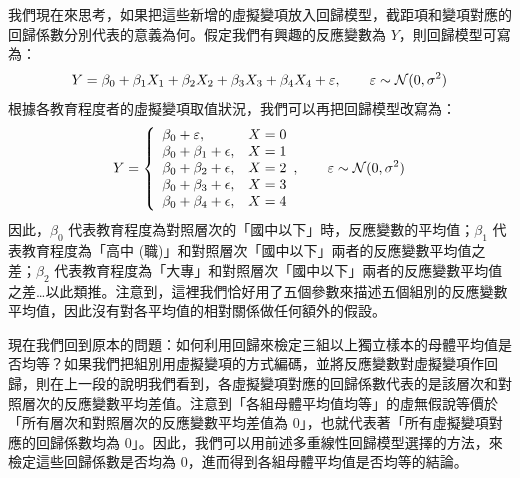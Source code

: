     我們現在來思考，如果把這些新增的虛擬變項放入回歸模型，截距項和變項對應的回歸係數分別代表的意義為何。假定我們有興趣的反應變數為 $Y$，則回歸模型可寫為：
    \[Y = \beta_0 + \beta_1 X_1 + \beta_2 X_2 + \beta_3 X_3 + \beta_4 X_4 + \varepsilon, \qquad \varepsilon \sim \mathcal{N}(0, \sigma^2)\]
    根據各教育程度者的虛擬變項取值狀況，我們可以再把回歸模型改寫為：
    \[Y = \left\{\begin{array}{lr}
        \beta_0 + \varepsilon, & X = 0\\
        \beta_0 + \beta_1 + \epsilon, & X = 1\\
        \beta_0 + \beta_2 + \epsilon, & X = 2\\
        \beta_0 + \beta_3 + \epsilon, & X = 3\\
        \beta_0 + \beta_4 + \epsilon, & X = 4
    \end{array}, \qquad \varepsilon \sim \mathcal{N}(0, \sigma^2) \right.\]
    因此，$\beta_0$ 代表教育程度為對照層次的「國中以下」時，反應變數的平均值；$\beta_1$ 代表教育程度為「高中 (職)」和對照層次「國中以下」兩者的反應變數平均值之差；$\beta_2$ 代表教育程度為「大專」和對照層次「國中以下」兩者的反應變數平均值之差…以此類推。注意到，這裡我們恰好用了五個參數來描述五個組別的反應變數平均值，因此沒有對各平均值的相對關係做任何額外的假設。

    現在我們回到原本的問題：如何利用回歸來檢定三組以上獨立樣本的母體平均值是否均等？如果我們把組別用虛擬變項的方式編碼，並將反應變數對虛擬變項作回歸，則在上一段的說明我們看到，各虛擬變項對應的回歸係數代表的是該層次和對照層次的反應變數平均差值。注意到「各組母體平均值均等」的虛無假說等價於「所有層次和對照層次的反應變數平均差值為 $0$」，也就代表著「所有虛擬變項對應的回歸係數均為 $0$」。因此，我們可以用前述多重線性回歸模型選擇的方法，來檢定這些回歸係數是否均為 $0$，進而得到各組母體平均值是否均等的結論。

